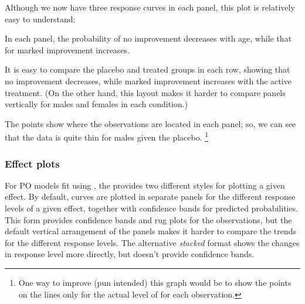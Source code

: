 \documentclass[11pt]{book}
\begin{document}
Although we now have three response curves in each panel, this plot is relatively easy to understand:
\begin{seriate}
  \item In each panel, the probability of no improvement decreases with age, while that for marked improvement increases.
  \item It is easy to compare the placebo and treated groups in each row, showing that
  no improvement decreases, while marked improvement increases with the active treatment.
  (On the other hand, this layout makes it harder to compare panels vertically for males
  and females in each condition.)
  \item The points show where the observations are located in each panel; so, we can see that
  the data is quite thin for males given the placebo.%
\footnote{
One way to improve (pun intended)
this graph would be to show the points on the lines only for the actual
level of  for each observation.
}
\end{seriate}

\subsubsection{Effect plots}\label{sec:po-effplots}

For PO models fit using , the  provides two different
styles for plotting a given effect.  By default, curves are plotted 
in separate panels for the different response levels of a given effect, together with 
confidence bands for predicted probabilities.  This form provides confidence bands
and rug plots for the observations, but the default vertical arrangement of the panels
makes it harder to compare the trends for the different response levels.
The alternative \emph{stacked} format shows the changes in response level more directly, but
doesn't provide confidence bands.
\end{document}
